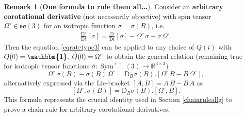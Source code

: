 \documentclass[10pt]{article}
\newcounter{theoremCounter}
\numberwithin{theoremCounter}{section}
\theoremstyle{plain}
\theoremstyle{definition}
\newtheorem{rem}[theoremCounter]{Remark}
\newcommand{\id}{{\boldsymbol{\mathbbm{1}}}}
\newcommand{\R}{\mathbb{R}}
\newcommand{\DD}{\mathrm{D}}
\DeclareMathOperator{\Sym}{Sym}
\numberwithin{equation}{section}
\begin{document}
\begin{rem}[\textbf{One formula to rule them all...}] \label{theoneremark}
Consider an \textbf{arbitrary corotational derivative} (not necessarily objective) with spin tensor $\Omega^{\circ} \in \mathfrak{so}(3)$ for an isotropic function $\sigma = \sigma(B)$, i.e.
	\begin{align}
	\label{eq:general_corotational_rate}
	\frac{\DD^{\circ}}{\DD t}[\sigma] = \frac{\DD}{\DD t}[\sigma] - \Omega^{\circ} \, \sigma + \sigma \, \Omega^{\circ}.
	\end{align}
Then the equation \eqref{eqratetype3} can be applied to any choice of $Q(t)$ with $Q(0) = \id, \; \dot Q(0) = \Omega^{\circ}$ to obtain the general relation (remaining true for isotropic tensor functions $\overline \sigma \colon \Sym^{++}(3) \to \R^{3 \times 3}$)
	\begin{equation}
	\label{eqgeneralomsig}
	\boxed{\Omega^{\circ} \, \sigma(B) - \sigma(B) \, \Omega^{\circ} = \DD_B\sigma(B).[\Omega^{\circ} \, B - B \, \Omega^{\circ}],}
	\end{equation}
alternatively expressed via the Lie-bracket $[A,B] = A \, B - B \, A$ as
	\begin{equation}
	\boxed{[\Omega^{\circ}, \sigma(B)] = \DD_B\sigma(B).[\Omega^{\circ}, B].}
	\end{equation}
This formula represents the crucial identity used in Section \ref{chainruleallg} to prove a chain rule for arbitrary corotational derivatives.
\end{rem}
%
\end{document}
